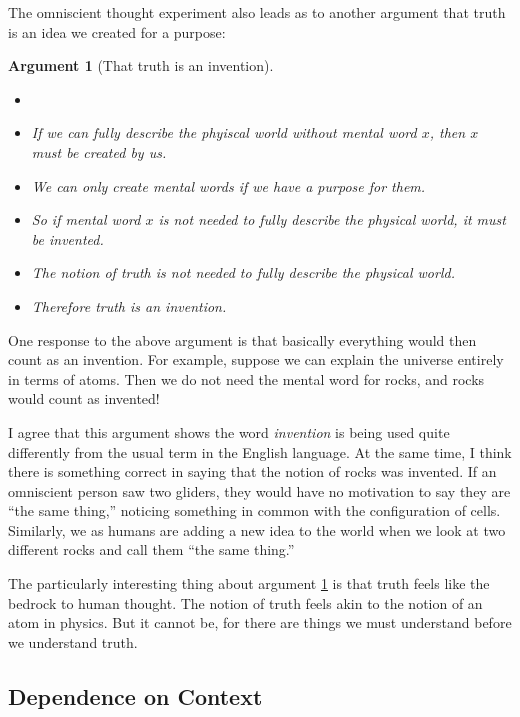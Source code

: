 \documentclass[11pt, oneside]{article}   	%
\newtheorem{argt}{Argument}
\begin{document}
The omniscient thought experiment also leads as to another argument that truth
is an idea we created for a purpose:

\begin{argt}[That truth is an invention]
    \label{a4}
    \normalfont
    \begin{itemize}
        \item[]
        \item If we can fully describe the phyiscal world without
            mental word $x$,
            then $x$ must be created by us.
        \item We can only create mental words if we have a purpose for them.
        \item So if mental word $x$ is not needed to fully describe the
            physical world, it must be invented.
        \item The notion of truth is not needed to fully describe the
            physical world.
        \item Therefore truth is an invention.
    \end{itemize}
\end{argt}

One response to the above argument is that basically everything would then count
as an invention. For example, suppose we can explain the universe entirely in
terms of atoms. Then we do not need the mental word for rocks, and rocks would
count as invented!

I agree that this argument shows the word {\em invention} is being used quite
differently from the usual term in the English language. At the same time, I
think there is something correct in saying that the notion of rocks was
invented. If an omniscient person saw two gliders, they would have no motivation
to say they are ``the same thing,'' noticing something in common with the
configuration of cells. Similarly, we as humans are adding a new idea to the
world when we look at two different rocks and call them ``the same thing.''

The particularly interesting thing about argument \ref{a4} is that truth feels
like the bedrock to human thought. The notion of truth feels akin to the notion
of an atom in physics. But it cannot be, for there are things we must understand
before we understand truth.



\subsection{Dependence on Context}
\end{document}

